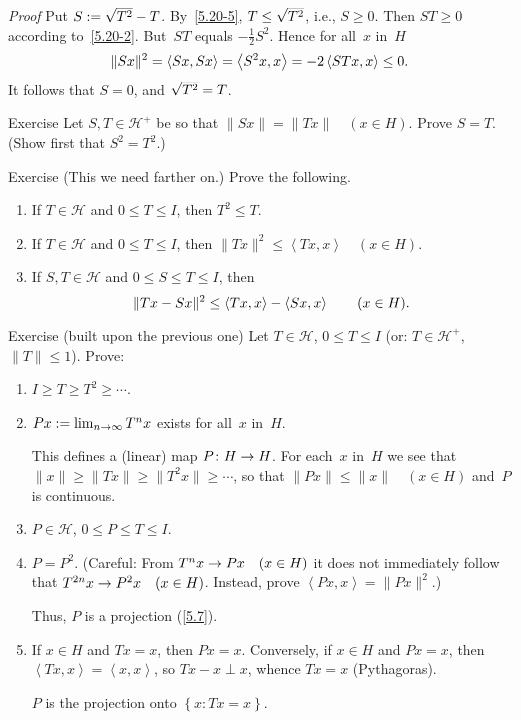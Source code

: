\documentclass[main.tex]{subfiles}
\begin{document}
\begin{psec}{5.20}
\begin{enumerate}
\noindent \emph{Proof} Put $S:=\smash{\sqrt{T^2}}-T$.
By~\ref{5.20-5}, $T\leq \smash{\sqrt{T^2}}$,
i.e., $S\geq 0$.
Then $ST\geq 0$ according to~\ref{5.20-2}.
But~$ST$ equals $-\frac{1}{2} S^2$.
Hence for all~$x$ in~$H$
\begin{equation*}
\|Sx\|^2 = \left<Sx,Sx\right>=\left<S^2 x,x\right>
=-2\left<STx,x\right>\leq 0\text{.}
\end{equation*}
It follows that $S=0$, and $\smash{\sqrt{T^2}}=T$. \xqed
\end{enumerate}
\end{psec}
%
%
\begin{psec}{5.21}{Exercise}
Let $S,T\in{\mathscr H}^+$ be so that $\|Sx\|=\|Tx\|\quad(x\in H)$.
Prove $S=T$.
(Show first that $S^2 = T^2$.)
\end{psec}
%
%
\begin{psec}{5.22}{Exercise}
(This we need farther on.)
Prove the following.
\begin{enumerate}
\item\label{5.22-1}
If $T\in\mathscr H$ and $0\leq T\leq I$, then $T^2\leq T$.
%
\item\label{5.22-2}
If $T\in\mathscr H$ and $0\leq T\leq I$,
then $\|Tx\|^2\leq \left< Tx,x\right>\quad (x\in H)$.
%
\item\label{5.22-3}
If $S,T\in\mathscr H$ and $0\leq S\leq T\leq I$,
then 
\begin{equation*}
\|Tx-Sx\|^2 \leq \left<Tx,x\right>-\left<Sx,x\right>\qquad (x\in H)\text{.}
\end{equation*}
\end{enumerate}
\end{psec}
%
%
\begin{psec}{5.23}{Exercise}
(built upon the previous one)
Let $T\in\mathscr H$, $0\leq T\leq I$
(or: $T\in{\mathscr H}^+$, $\|T\|\leq 1$).
Prove:
\begin{enumerate}
\item\label{5.23-1}
$I\geq T \geq T^2 \geq \dotsb$.
%
\item\label{5.23-2}
$Px:=\lim_{n\rightarrow\infty} T^n x$ exists for all~$x$ in~$H$.

This defines a (linear) map $P\colon H\rightarrow H$.
For each~$x$ in~$H$
we see that $\|x\|\geq\|Tx\|\geq\|T^2 x\|\geq \dotsb$,
so that $\|Px\|\leq \|x\|\quad (x\in H)$
and~$P$ is continuous.
%
\item\label{5.23-3}
$P\in\mathscr H$, $0\leq P \leq T\leq I$.
%
\item\label{5.23-4}
$P=P^2$. (Careful: From $T^n x\rightarrow Px\quad(x\in H)$
it does not immediately follow that $T^{2n} x\rightarrow P^2 x\quad(x\in H)$.
Instead, prove $\left<Px,x\right>=\|Px\|^2$.)

Thus, $P$ is a projection (\ref{5.7}).
%
\item\label{5.23-5}
If $x\in H$ and $Tx=x$,
then $Px=x$.
Conversely,
if $x\in H$ and $Px=x$,
then $\left< Tx,x\right>=\left<x,x\right>$,
so $Tx-x\perp x$,
whence $Tx=x$ (Pythagoras).

$P$ is the projection onto $\left\{ x\colon Tx=x \right\}$.
\end{enumerate}
\end{psec}
\end{document}
